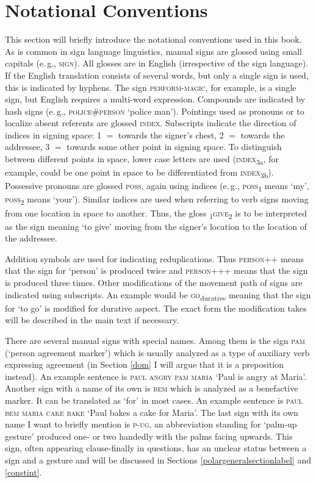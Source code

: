 \chapter*{Notational Conventions}
This section will briefly introduce the notational conventions used in this book. As is common in sign language linguistics, manual signs are glossed using small capitals (e.\,g., \textsc{sign}). All glosses are in English (irrespective of the sign language). If the English translation consists of several words, but only a single sign is used, this is indicated by hyphens. The sign \textsc{perform-magic}, for example, is a single sign, but English requires a multi-word expression. Compounds are indicated by hash signs (e.\,g., \textsc{police\#person} `police man'). Pointings used as pronouns or to localize absent referents are glossed \textsc{index}. Subscripts indicate the direction of indices in signing space: 1 $=$ towards the signer's chest, 2 $=$ towards the addressee, 3 $=$ towards some other point in signing space. To distinguish between different points in space, lower case letters are used (\textsc{index}\textsubscript{3a}, for example, could be one point in space to be differentiated from \textsc{index}\textsubscript{3b}). Possessive pronouns are glossed \textsc{poss}, again using indices (e.\,g., \textsc{poss}\textsubscript{1} means `my', \textsc{poss}\textsubscript{2} means `your'). Similar indices are used when referring to verb signs moving from one location in space to another. Thus, the gloss \textsubscript{1}\textsc{give}\textsubscript{2} is to be interpreted as the sign meaning `to give' moving from the signer’s location to the location of the addressee. 

Addition symbols are used for indicating reduplications. Thus \textsc{person}++ means that the sign for `person' is produced twice and \textsc{person}+++ means that the sign is produced three times. Other modifications of the movement path of signs are indicated using subscripts. An example would be \textsc{go}\textsubscript{durative} meaning that the sign for `to go' is modified for durative aspect. The exact form the modification takes will be described in the main text if necessary.

There are several manual signs with special names. Among them is the sign \textsc{pam} (`person agreement marker') which is usually analyzed as a type of auxiliary verb expressing agreement (in Section \ref{dom} I will argue that it is a preposition instead). An example sentence is \textsc{paul angry pam maria} `Paul is angry at Maria'. Another sign with a name of its own is \textsc{bem} which is analyzed as a benefactive marker. It can be translated as `for' in most cases. An example sentence is \textsc{paul bem maria cake bake} `Paul bakes a cake for Maria'. The last sign with its own name I want to briefly mention is \textsc{p-ug}, an abbreviation standing for `palm-up gesture' produced one- or two handedly with the palms facing upwards. This sign, often appearing clause-finally in questions, has an unclear status between a sign and a gesture and will be discussed in Sections \ref{polargeneralsectionlabel} and \ref{constint}. 

